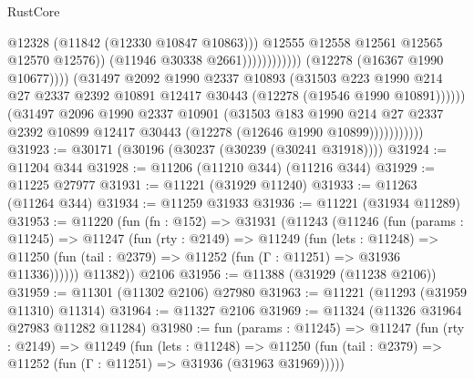 \begin{lexlean}{RustCore}
\begin{coremodule}
                                                      @12328
                                                      (@11842 (@12330 @10847 @10863)))
                                                    @12555
                                                    @12558
                                                    @12561
                                                    @12565
                                                    @12570
                                                    @12576))
                                                (@11946 @30338 @2661))))))))))))
                          (@12278 (@16367 @1990 @10677))))
                      (@31497
                        @2092
                        @1990
                        @2337
                        @10893
                        (@31503
                          @223
                          @1990
                          @214
                          @27
                          @2337
                          @2392
                          @10891
                          @12417
                          @30443
                          (@12278 (@19546 @1990 @10891))))))
                  (@31497
                    @2096
                    @1990
                    @2337
                    @10901
                    (@31503
                      @183
                      @1990
                      @214
                      @27
                      @2337
                      @2392
                      @10899
                      @12417
                      @30443
                      (@12278 (@12646 @1990 @10899)))))))))))
@31923 := @30171 (@30196 (@30237 (@30239 (@30241 @31918))))
@31924 := @11204 @344
@31928 := @11206 (@11210 @344) (@11216 @344)
@31929 := @11225 @27977
@31931 := @11221 (@31929 @11240)
@31933 := @11263 (@11264 @344)
@31934 := @11259 @31933
@31936 := @11221 (@31934 @11289)
@31953 := @11220
    (fun (fn : @152) =>
    @31931
      (@11243
        (@11246
          (fun (params : @11245) =>
          @11247
            (fun (rty : @2149) =>
            @11249
              (fun (lets : @11248) =>
              @11250 (fun (tail : @2379) => @11252 (fun (Γ : @11251) => @31936 @11336))))))
        @11382))
    @2106
@31956 := @11388 (@31929 (@11238 @2106))
@31959 := @11301 (@11302 @2106) @27980
@31963 := @11221 (@11293 (@31959 @11310) @11314)
@31964 := @11327 @2106
@31969 := @11324 (@11326 @31964 @27983 @11282 @11284)
@31980 := fun (params : @11245) =>
  @11247
    (fun (rty : @2149) =>
    @11249
      (fun (lets : @11248) =>
      @11250 (fun (tail : @2379) => @11252 (fun (Γ : @11251) => @31936 (@31963 @31969)))))

\end{coremodule}
\end{lexlean}
